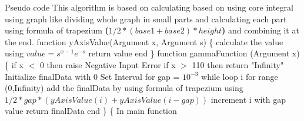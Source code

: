 \documentclass[final]{beamer}
\newlength{\onecolwid}
\newlength{\twocolwid}
\begin{document}
\begin{frame}
\begin{columns}[t]
\begin{column}{\twocolwid}
\begin{columns}[t,totalwidth=\twocolwid]
\begin{column}{\onecolwid}
\begin{exampleblock}{Pseudo code}
\small{This algorithm is based on calculating based on using core integral using graph like dividing whole graph in small parts and calculating each part using formula of trapezium \textbf{($ 1/2*(base1 + base2)*height $)} and combining it at the end.\newline\newline
function yAxisValue(Argument x, Argument s) \{ \newline 
\hspace*{20pt}calculate the value using $value = {s^{x - 1} e^{ - s}}$\newline
\hspace*{20pt}return value\newline
end \newline
\}  \newline
function gammaFunction (Argument x) \{ \newline
\hspace*{20pt} if x $<$ 0\newline
\hspace*{50pt} then raise Negative Input Error\newline
\hspace*{20pt} if x $>$ 110\newline
\hspace*{50pt} then return "Infinity"\newline
\hspace*{20pt} Initialize finalData with 0\newline
\hspace*{20pt} Set Interval for gap = $10 ^ {-3}$ \newline
\hspace*{20pt} while loop i for range (0,Infinity)\newline
\hspace*{50pt} add the finalData by using formula of trapezium using \newline 
\hspace*{50pt} \textbf{$1/2*gap*(yAxisValue(i) + yAxisValue(i-gap))$} \newline
\hspace*{50pt} increment i with gap value \newline
\hspace*{20pt} return finalData\newline
end \newline
\} \{ \newline
In main function \newline
}
\end{exampleblock}
\end{column}
\end{columns}
\end{column}
\end{columns}
\end{frame}
\end{document}
